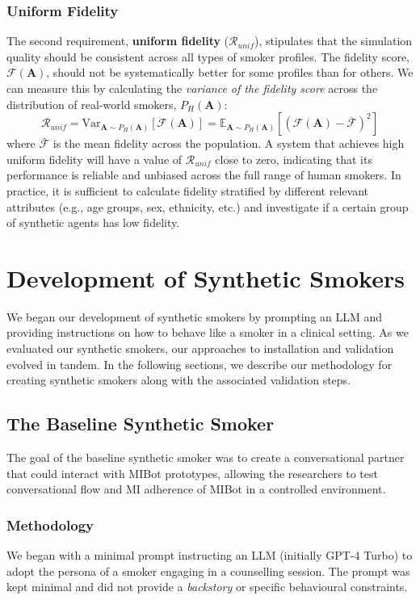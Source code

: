 \subsubsection{Uniform Fidelity}
\label{uniform-fidelity}

The second requirement, \textbf{uniform fidelity} ($\mathcal{R}_{unif}$), stipulates that the simulation quality should be consistent across all types of smoker profiles. The fidelity score, $\mathcal{F}(\textbf{A})$, should not be systematically better for some profiles than for others. We can measure this by calculating the \textit{variance of the fidelity score} across the distribution of real-world smokers, $P_H(\textbf{A})$:
\[\mathcal{R}_{unif} = \text{Var}_{\textbf{A} \sim P_H(\textbf{A})}[\mathcal{F}(\textbf{A})] = \mathbb{E}_{\textbf{A} \sim P_H(\textbf{A})} [(\mathcal{F}(\textbf{A}) - \bar{\mathcal{F}})^2]\]
where $\bar{\mathcal{F}}$ is the mean fidelity across the population. A system that achieves high uniform fidelity will have a value of $\mathcal{R}_{unif}$ close to zero, indicating that its performance is reliable and unbiased across the full range of human smokers. In practice, it is sufficient to calculate fidelity stratified by different relevant attributes (e.g., age groups, sex, ethnicity, etc.) and investigate if a certain group of synthetic agents has low fidelity.


\section{Development of Synthetic Smokers}
We began our development of synthetic smokers by prompting an LLM and providing instructions on how to behave like a smoker in a clinical setting. As we evaluated our synthetic smokers, our approaches to installation and validation evolved in tandem. In the following sections, we describe our methodology for creating synthetic smokers along with the associated validation steps.


\subsection{The Baseline Synthetic Smoker}
\label{sec:synthetic-smoker-baseline}
The goal of the baseline synthetic smoker was to create a conversational partner that could interact with MIBot prototypes, allowing the researchers to test conversational flow and MI adherence of MIBot in a controlled environment.


\subsubsection{Methodology}
We began with a minimal prompt instructing an LLM (initially GPT-4 Turbo) to adopt the persona of a smoker engaging in a counselling session. The prompt was kept minimal and did not provide a \emph{backstory} or specific behavioural constraints.

